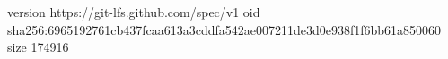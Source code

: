 version https://git-lfs.github.com/spec/v1
oid sha256:6965192761cb437fcaa613a3cddfa542ae007211de3d0e938f1f6bb61a850060
size 174916
